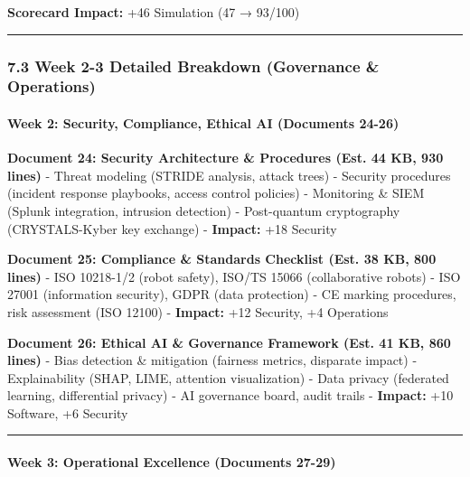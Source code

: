 \documentclass[
]{article}
\begin{document}
\textbf{Scorecard Impact:} +46 Simulation (47 → 93/100)

\begin{center}\rule{0.5\linewidth}{0.5pt}\end{center}

\hypertarget{week-2-3-detailed-breakdown-governance-operations}{%
\subsubsection{7.3 Week 2-3 Detailed Breakdown (Governance \&
Operations)}\label{week-2-3-detailed-breakdown-governance-operations}}

\hypertarget{week-2-security-compliance-ethical-ai-documents-24-26}{%
\paragraph{Week 2: Security, Compliance, Ethical AI (Documents
24-26)}\label{week-2-security-compliance-ethical-ai-documents-24-26}}

\textbf{Document 24: Security Architecture \& Procedures (Est. 44 KB,
930 lines)} - Threat modeling (STRIDE analysis, attack trees) - Security
procedures (incident response playbooks, access control policies) -
Monitoring \& SIEM (Splunk integration, intrusion detection) -
Post-quantum cryptography (CRYSTALS-Kyber key exchange) -
\textbf{Impact:} +18 Security

\textbf{Document 25: Compliance \& Standards Checklist (Est. 38 KB, 800
lines)} - ISO 10218-1/2 (robot safety), ISO/TS 15066 (collaborative
robots) - ISO 27001 (information security), GDPR (data protection) - CE
marking procedures, risk assessment (ISO 12100) - \textbf{Impact:} +12
Security, +4 Operations

\textbf{Document 26: Ethical AI \& Governance Framework (Est. 41 KB, 860
lines)} - Bias detection \& mitigation (fairness metrics, disparate
impact) - Explainability (SHAP, LIME, attention visualization) - Data
privacy (federated learning, differential privacy) - AI governance
board, audit trails - \textbf{Impact:} +10 Software, +6 Security

\begin{center}\rule{0.5\linewidth}{0.5pt}\end{center}

\hypertarget{week-3-operational-excellence-documents-27-29}{%
\paragraph{Week 3: Operational Excellence (Documents
27-29)}\label{week-3-operational-excellence-documents-27-29}}
\end{document}
